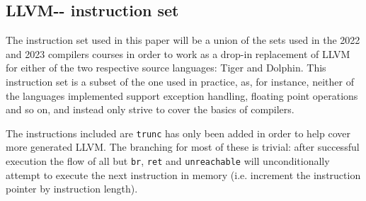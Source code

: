 \documentclass{article}
\begin{document}


\subsection{LLVM-{}- instruction set}


The instruction set used in this paper will be a union of the sets used in the 2022 and 2023 compilers courses in order to work as a drop-in replacement of LLVM for either of the two respective source languages:  Tiger and Dolphin. This instruction set is a subset of the one used in practice, as, for instance, neither of the languages implemented support exception handling, floating point operations and so on, and instead only strive to cover the basics of compilers.

The instructions included are
\lstinline!trunc! has only been added in order to help cover more generated LLVM. %
The branching for most of these is trivial: after successful execution the flow of all but \lstinline!br!, \lstinline!ret! and \lstinline!unreachable! will unconditionally attempt to execute the next instruction in memory (i.e. increment the instruction pointer by instruction length).

\end{document}
